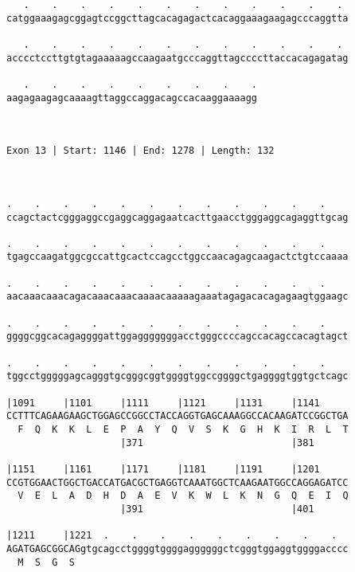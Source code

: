 \documentclass{article}
\begin{document}
\begin{Verbatim}
   .    .    .    .    .    .    .    .    .    .    .    . 
catggaaagagcggagtccggcttagcacagagactcacaggaaagaagagcccaggtta
                                                            
   .    .    .    .    .    .    .    .    .    .    .    . 
acccctccttgtgtagaaaaagccaagaatgcccaggttagccccttaccacagagatag
                                                            
   .    .    .    .    .    .    .    .    .
aagagaagagcaaaagttaggccaggacagccacaaggaaaagg
                                            
                                            
 
Exon 13 | Start: 1146 | End: 1278 | Length: 132



.    .    .    .    .    .    .    .    .    .    .    .    
ccagctactcgggaggccgaggcaggagaatcacttgaacctgggaggcagaggttgcag
                                                            
.    .    .    .    .    .    .    .    .    .    .    .    
tgagccaagatggcgccattgcactccagcctggccaacagagcaagactctgtccaaaa
                                                            
.    .    .    .    .    .    .    .    .    .    .    .    
aacaaacaaacagacaaacaaacaaaacaaaaagaaatagagacacagagaagtggaagc
                                                            
.    .    .    .    .    .    .    .    .    .    .    .    
ggggcggcacagaggggattggagggggggacctgggccccagccacagccacagtagct
                                                            
.    .    .    .    .    .    .    .    .    .    .    .    
tggcctgggggagcagggtgcgggcggtggggtggccggggctgaggggtggtgctcagc
                                                            
|1091     |1101     |1111     |1121     |1131     |1141     
CCTTTCAGAAGAAGCTGGAGCCGGCCTACCAGGTGAGCAAAGGCCACAAGATCCGGCTGA
  F  Q  K  K  L  E  P  A  Y  Q  V  S  K  G  H  K  I  R  L  T
                    |371                          |381      
  
|1151     |1161     |1171     |1181     |1191     |1201     
CCGTGGAACTGGCTGACCATGACGCTGAGGTCAAATGGCTCAAGAATGGCCAGGAGATCC
  V  E  L  A  D  H  D  A  E  V  K  W  L  K  N  G  Q  E  I  Q
                    |391                          |401      
  
|1211     |1221  .    .    .    .    .    .    .    .    .  
AGATGAGCGGCAGgtgcagcctggggtggggaggggggctcgggtggaggtggggacccc
  M  S  G  S                                                
                                                            

\end{Verbatim}
\end{document}
